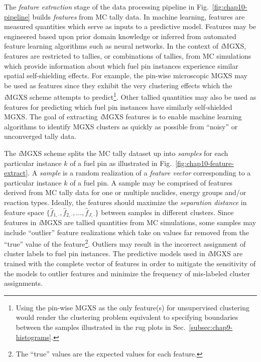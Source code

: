 The \textit{feature extraction} stage of the data processing pipeline in Fig.~\ref{fig:chap10-pipeline} builds \textit{features} from \ac{MC} tally data. In machine learning, features are measured quantities which serve as inputs to a predictive model. Features may be engineered based upon prior domain knowledge or inferred from automated feature learning algorithms such as neural networks. In the context of \textit{i}\ac{MGXS}, features are restricted to tallies, or combinations of tallies, from \ac{MC} simulations which provide information about which fuel pin instances experience similar spatial self-shielding effects. For example, the pin-wise microscopic \ac{MGXS} may be used as features since they exhibit the very clustering effects which the \textit{i}\ac{MGXS} scheme attempts to predict\footnote{Using the pin-wise \ac{MGXS} as the only feature(s) for unsupervised clustering would render the clustering problem equivalent to specifying boundaries between the samples illustrated in the rug plots in Sec.~\ref{subsec:chap9-histograms}.}. Other tallied quantities may also be used as features for predicting which fuel pin instances have similarly self-shielded \ac{MGXS}. The goal of extracting \textit{i}\ac{MGXS} features is to enable machine learning algorithms to identify \ac{MGXS} clusters as quickly as possible from ``noisy'' or unconverged tally data.

The \textit{i}\ac{MGXS} scheme splits the \ac{MC} tally dataset up into \textit{samples} for each particular instance $k$ of a fuel pin as illustrated in Fig.~\ref{fig:chap10-feature-extract}. A \textit{sample} is a random realization of a \textit{feature vector} corresponding to a particular instance $k$ of a fuel pin. A sample may be comprised of features derived from \ac{MC} tally data for one or multiple nuclides, energy groups and/or reaction types. Ideally, the features should maximize the \textit{separation distance} in feature space $\{\hat{f}_{1,\cdot}, \hat{f}_{2,\cdot}, \dots, \hat{f}_{J,\cdot}\}$ between samples in different clusters. Since features in \textit{i}\ac{MGXS} are tallied quantities from \ac{MC} simulations, some samples may include ``outlier'' feature realizations which take on values far removed from the ``true'' value of the feature\footnote{The ``true'' values are the expected values for each feature.}. Outliers may result in the incorrect assignment of cluster labels to fuel pin instances. The predictive models used in \textit{i}\ac{MGXS} are trained with the complete vector of features in order to mitigate the sensitivity of the models to outlier features and minimize the frequency of mis-labeled cluster assignments.

